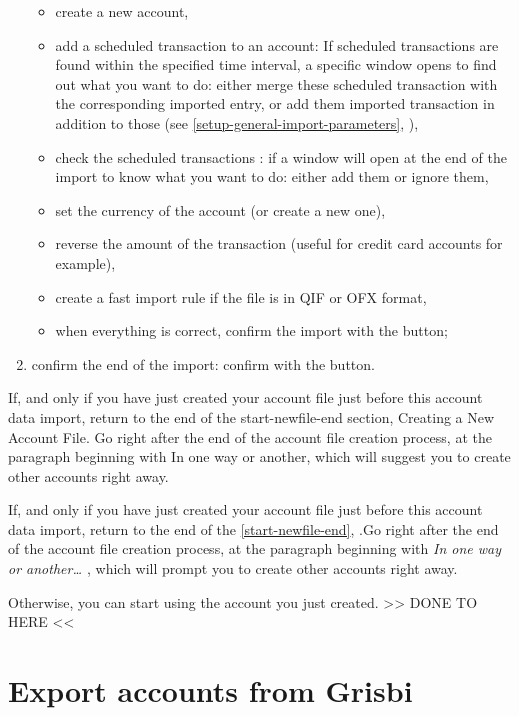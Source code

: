 \begin{enumerate}
		\begin{itemize}
			\item create a new account,
			\item add a scheduled transaction to an account: If scheduled transactions are found within the specified time interval, a specific window opens to find out what you want to do: either merge these scheduled transaction with the corresponding imported entry, or add them imported transaction in addition to those (see \vref{setup-general-import-parameters}, ),
			\item check the scheduled transactions : if   a window will open at the end of the import to know what you want to do: either add them or ignore them,
			\item set the currency of the account (or create a new one),
			\item   reverse the amount of the transaction (useful for credit card accounts for example),
			\item create a fast import rule if the file is in QIF or OFX format,
			\item when everything is correct, confirm the import with the  button;
		\end{itemize}
	
	 \item confirm the end of the import: confirm with the  button.
\end{enumerate}

If, and only if you have just created your account file just before this account data import, return to the end of the start-newfile-end section, Creating a New Account File. Go right after the end of the account file creation process, at the paragraph beginning with In one way or another, which will suggest you to create other accounts right away.

If, and only if you have just created your account file just before this account data import, return to the end of the  \vref{start-newfile-end}, .Go right after the end of the account file creation process, at the paragraph beginning with \emph{In one way or another\ldots{ }}, which will prompt you to create other accounts right away.

Otherwise, you can start using the account you just created.
>> DONE TO HERE  <<


\section{Export accounts from Grisbi\label{move-export}}

